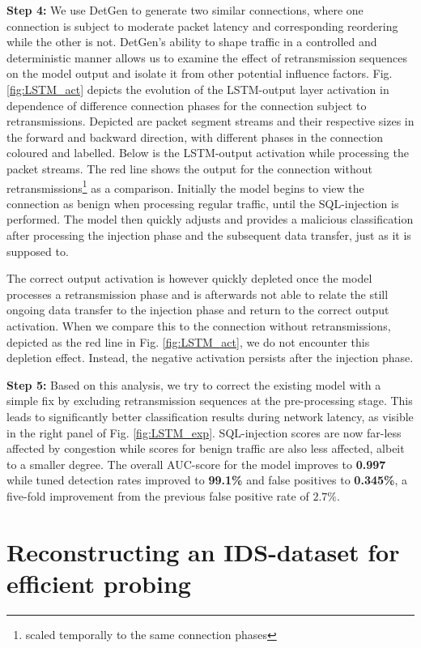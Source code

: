 \documentclass[runningheads]{llncs}
\begin{document}
\textbf{Step 4:} We use DetGen to generate two similar connections, where one connection is subject to moderate packet latency and corresponding reordering while the other is not. DetGen's ability to shape traffic in a controlled and deterministic manner allows us to examine the effect of retransmission sequences on the model output and isolate it from other potential influence factors. 
Fig. \ref{fig:LSTM_act} depicts the evolution of the LSTM-output layer activation in dependence of difference connection phases for the connection subject to retransmissions. Depicted are packet segment streams and their respective sizes in the forward and backward direction, with different phases in the connection coloured and labelled. Below is the LSTM-output activation while processing the packet streams. The red line shows the output for the connection without retransmissions\footnote{scaled temporally to the same connection phases} as a comparison.
Initially the model begins to view the connection as benign when processing regular traffic, until the SQL-injection is performed. The model then quickly adjusts and provides a malicious classification after processing the injection phase and the subsequent data transfer, just as it is supposed to. 

The correct output activation is however quickly depleted once the model processes a retransmission phase and is afterwards not able to relate the still ongoing data transfer to the injection phase and return to the correct output activation. When we compare this to the connection without retransmissions, depicted as the red line in Fig. \ref{fig:LSTM_act}, we do not encounter this depletion effect. Instead, the negative activation persists after the injection phase.

\textbf{Step 5:} Based on this analysis, we try to correct the existing model with a simple fix by excluding retransmission sequences at the pre-processing stage. This leads to significantly better classification results during network latency, as visible in the right panel of Fig. \ref{fig:LSTM_exp}. SQL-injection scores are now far-less affected by congestion while scores for benign traffic are also less affected, albeit to a smaller degree.
The overall AUC-score for the model improves to \textbf{0.997} while tuned detection rates improved to \textbf{99.1\%} and false positives to \textbf{0.345\%}, a five-fold improvement from the previous false positive rate of $2.7\%$. 



\section{Reconstructing an IDS-dataset for efficient probing}\label{Sec:ProbData}
\end{document}
